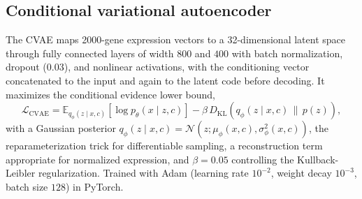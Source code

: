 \documentclass[11pt]{article}
\begin{document}
\subsection{Conditional variational autoencoder}
The CVAE maps 2000-gene expression vectors to a 32-dimensional latent space through fully connected layers of width $800$ and $400$ with batch normalization, dropout ($0.03$), and nonlinear activations, with the conditioning vector concatenated to the input and again to the latent code before decoding. It maximizes the conditional evidence lower bound,
\begin{equation}
\mathcal{L}_{\mathrm{CVAE}} = \mathbb{E}_{q_\phi(z\mid x,c)}\left[\log p_\theta(x\mid z,c)\right] - \beta\, D_{\mathrm{KL}}\!\left(q_\phi(z\mid x,c)\,\|\,p(z)\right),
\end{equation}
with a Gaussian posterior $q_\phi(z\mid x,c)=\mathcal{N}(z;\mu_\phi(x,c),\sigma_\phi^2(x,c))$, the reparameterization trick for differentiable sampling, a reconstruction term appropriate for normalized expression, and $\beta=0.05$ controlling the Kullback-Leibler regularization. Trained with Adam (learning rate $10^{-2}$, weight decay $10^{-3}$, batch size $128$) in PyTorch.
\end{document}
